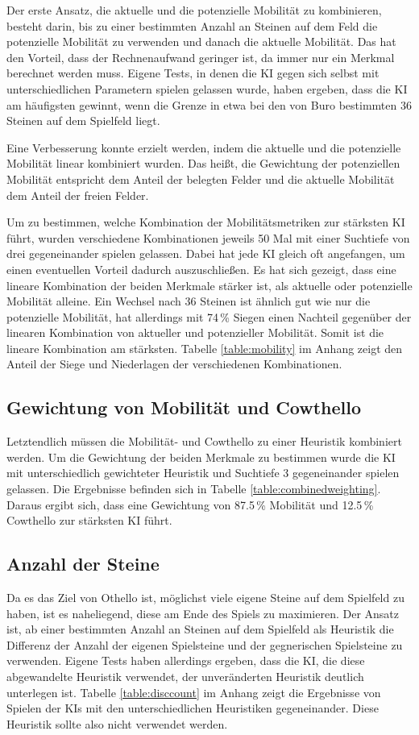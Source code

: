 Der erste Ansatz, die aktuelle und die potenzielle Mobilität zu kombinieren, besteht darin, bis zu einer bestimmten
Anzahl an Steinen auf dem Feld die potenzielle Mobilität zu verwenden und danach die aktuelle Mobilität. Das hat den
Vorteil, dass der Rechnenaufwand geringer ist, da immer nur ein Merkmal berechnet werden muss. Eigene Tests, in denen die \ac{KI}
gegen sich selbst mit unterschiedlichen Parametern spielen gelassen wurde, haben ergeben, dass die \ac{KI} am häufigsten
gewinnt, wenn die Grenze in etwa bei den von Buro bestimmten 36 Steinen auf dem Spielfeld liegt.

Eine Verbesserung konnte erzielt werden, indem die aktuelle und die potenzielle Mobilität linear kombiniert wurden.
Das heißt, die Gewichtung der potenziellen Mobilität entspricht dem Anteil der belegten Felder und die aktuelle Mobilität
dem Anteil der freien Felder.

Um zu bestimmen, welche Kombination der Mobilitätsmetriken zur stärksten \ac{KI} führt, wurden verschiedene
Kombinationen jeweils 50 Mal mit einer Suchtiefe von drei gegeneinander spielen gelassen. Dabei hat jede \ac{KI} gleich
oft angefangen, um einen eventuellen Vorteil dadurch auszuschließen. Es hat sich gezeigt, dass eine lineare Kombination
der beiden Merkmale stärker ist, als aktuelle oder potenzielle Mobilität alleine. Ein Wechsel nach 36 Steinen ist ähnlich gut wie nur die potenzielle Mobilität, hat allerdings mit 74\,\% Siegen einen
Nachteil gegenüber der linearen Kombination von aktueller
und potenzieller Mobilität. Somit ist die lineare Kombination am stärksten. Tabelle \ref{table:mobility} im
Anhang zeigt den Anteil der Siege und Niederlagen der verschiedenen Kombinationen.

\subsection{Gewichtung von Mobilität und Cowthello} \label{sec:mobcowweight}
Letztendlich müssen die Mobilität- und Cowthello zu einer Heuristik kombiniert werden. Um die Gewichtung der beiden
Merkmale zu bestimmen wurde die \ac{KI} mit unterschiedlich gewichteter Heuristik und Suchtiefe 3 gegeneinander spielen
gelassen. Die Ergebnisse befinden sich in Tabelle \ref{table:combinedweighting}. Daraus ergibt sich, dass eine
Gewichtung von 87.5\,\% Mobilität und 12.5\,\% Cowthello zur stärksten \ac{KI} führt.

\subsection{Anzahl der Steine}
Da es das Ziel von Othello ist, möglichst viele eigene Steine auf dem Spielfeld zu haben, ist es naheliegend, diese am
Ende des Spiels zu maximieren. Der Ansatz ist, ab einer bestimmten Anzahl an Steinen auf dem Spielfeld als Heuristik die
Differenz der Anzahl der eigenen Spielsteine und der gegnerischen Spielsteine zu verwenden. Eigene Tests haben allerdings
ergeben, dass die \ac{KI}, die diese abgewandelte Heuristik verwendet, der unveränderten Heuristik deutlich unterlegen ist.
Tabelle \ref{table:disccount} im Anhang zeigt die Ergebnisse von Spielen der \acp{KI} mit den unterschiedlichen Heuristiken
gegeneinander. Diese Heuristik sollte also nicht verwendet werden.
